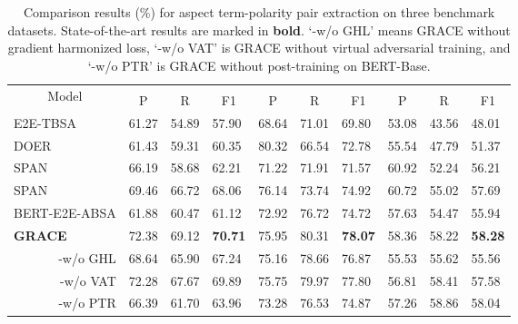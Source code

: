 \documentclass[11pt,a4paper]{article}
\begin{document}
\begin{table*}[tp]
    \centering
    \begin{tabular}{|p{3.0cm}|p{0.9cm}<{\centering}p{0.9cm}<{\centering}p{0.95cm}<{\centering}|p{0.9cm}<{\centering}p{0.9cm}<{\centering}p{0.95cm}<{\centering}|p{0.9cm}<{\centering}p{0.9cm}<{\centering}p{0.95cm}<{\centering}|}
    \hline
    \multicolumn{1}{|c|}{\multirow{2}{*}{Model}} & \multicolumn{3}{c|}{}                              & \multicolumn{3}{c|}{}                              & \multicolumn{3}{c|}{}                              \\ \cline{2-10} 
    \multicolumn{1}{|c|}{}                       & \multicolumn{1}{c}{P} & \multicolumn{1}{c}{R} & \multicolumn{1}{c|}{F1} & \multicolumn{1}{c}{P} & \multicolumn{1}{c}{R} & \multicolumn{1}{c|}{F1} & \multicolumn{1}{c}{P} & \multicolumn{1}{c}{R} & \multicolumn{1}{c|}{F1} \\ \hline \hline
    E2E-TBSA            & 61.27 & 54.89 & 57.90 & 68.64 & 71.01 & 69.80 & 53.08 & 43.56 & 48.01 \\
    DOER & 61.43 & 59.31 & 60.35 & 80.32 & 66.54 & 72.78 & 55.54 & 47.79 & 51.37 \\ 
    SPAN       & 66.19 & 58.68 & 62.21 & 71.22 & 71.91 & 71.57 & 60.92 & 52.24 & 56.21 \\ 
    SPAN      & 69.46 & 66.72 & 68.06 & 76.14 & 73.74 & 74.92 & 60.72 & 55.02 & 57.69 \\
    BERT-E2E-ABSA       & 61.88 & 60.47 & 61.12 & 72.92 & 76.72 & 74.72 & 57.63 & 54.47 & 55.94 \\ 
    \hline
    \textbf{GRACE} & 72.38 & 69.12 & \textbf{70.71} & 75.95 & 80.31 & \textbf{78.07} & 58.36 & 58.22 & \textbf{58.28} \\ 
    \multicolumn{1}{|r|}{-w/o GHL} & 68.64 & 65.90 & 67.24 & 75.16 & 78.66 & 76.87 & 55.53 & 55.62 & 55.56 \\ 
    \multicolumn{1}{|r|}{-w/o VAT} & 72.28 & 67.67 & 69.89 & 75.75 & 79.97 & 77.80 & 56.81 & 58.41 & 57.58  \\ 
    \multicolumn{1}{|r|}{-w/o PTR} & 66.39 & 61.70 & 63.96 & 73.28 & 76.53 & 74.87 & 57.26 & 58.86 & 58.04 \\ 
    \hline
    \end{tabular}
    \caption{Comparison results (\%) for aspect term-polarity pair extraction on three benchmark datasets. State-of-the-art results are marked in \textbf{bold}. `-w/o GHL' means GRACE without gradient harmonized loss, `-w/o VAT' is GRACE without virtual adversarial training, and `-w/o PTR' is GRACE without post-training on BERT-Base.}
    \label{tab_main_results}
\end{table*}
\end{document}
